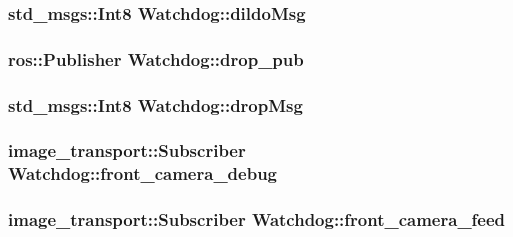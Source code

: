 \subsubsection[{\texorpdfstring{dildo\+Msg}{dildoMsg}}]{\setlength{\rightskip}{0pt plus 5cm}std\+\_\+msgs\+::\+Int8 Watchdog\+::dildo\+Msg\hspace{0.3cm}{\ttfamily [private]}}\hypertarget{classWatchdog_afc886d9b35091b31e733492a2c2a9256}{}\label{classWatchdog_afc886d9b35091b31e733492a2c2a9256}
\subsubsection[{\texorpdfstring{drop\+\_\+pub}{drop_pub}}]{\setlength{\rightskip}{0pt plus 5cm}ros\+::\+Publisher Watchdog\+::drop\+\_\+pub\hspace{0.3cm}{\ttfamily [private]}}\hypertarget{classWatchdog_aa347b0561e507570cb5f6fdfe5ae8770}{}\label{classWatchdog_aa347b0561e507570cb5f6fdfe5ae8770}
\subsubsection[{\texorpdfstring{drop\+Msg}{dropMsg}}]{\setlength{\rightskip}{0pt plus 5cm}std\+\_\+msgs\+::\+Int8 Watchdog\+::drop\+Msg\hspace{0.3cm}{\ttfamily [private]}}\hypertarget{classWatchdog_ac3c684605e0a6aaf0256618c800c1533}{}\label{classWatchdog_ac3c684605e0a6aaf0256618c800c1533}
\subsubsection[{\texorpdfstring{front\+\_\+camera\+\_\+debug}{front_camera_debug}}]{\setlength{\rightskip}{0pt plus 5cm}image\+\_\+transport\+::\+Subscriber Watchdog\+::front\+\_\+camera\+\_\+debug\hspace{0.3cm}{\ttfamily [private]}}\hypertarget{classWatchdog_a7859b793281678f2dbef7a7f902e97c4}{}\label{classWatchdog_a7859b793281678f2dbef7a7f902e97c4}
\subsubsection[{\texorpdfstring{front\+\_\+camera\+\_\+feed}{front_camera_feed}}]{\setlength{\rightskip}{0pt plus 5cm}image\+\_\+transport\+::\+Subscriber Watchdog\+::front\+\_\+camera\+\_\+feed\hspace{0.3cm}{\ttfamily [private]}}\hypertarget{classWatchdog_a1c9bd1f1f08c7cd78a442f071e2baa8e}{}\label{classWatchdog_a1c9bd1f1f08c7cd78a442f071e2baa8e}
